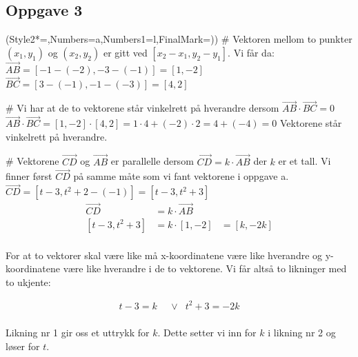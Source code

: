 \subsection*{Oppgave 3}

\begin{easylist}[enumerate]
	\ListProperties(Style2*=,Numbers=a,Numbers1=l,FinalMark={)})
	# Vektoren mellom to punkter $(x_1,y_1)$ og $(x_2,y_2)$ er gitt ved $[x_2 - x_1, y_2 -y_1]$. Vi får da: \newline
	$\vec{AB} = [-1-(-2), -3-(-1)] = [1,-2]$\newline
	$\vec{BC} = [3-(-1),-1-(-3)] = [4,2]$
	
	# Vi har at de to vektorene står vinkelrett på hverandre dersom $\vec{AB} \cdot \vec{BC} = 0$\newline
	$\vec{AB} \cdot \vec{BC} = [1,-2] \cdot [4,2] = 1 \cdot 4 + (-2) \cdot 2 = 4 + (-4) = 0$
	\newline \newline
	Vektorene står vinkelrett på hverandre.
	
	# Vektorene $\vec{CD}$ og $\vec{AB}$ er parallelle dersom $\vec{CD} = k \cdot \vec{AB}$ der $k$ er et tall. Vi finner først $\vec{CD}$ på samme måte som vi fant vektorene i oppgave a. \newline
	$\vec{CD} = [t-3,t^2 + 2- (-1)] = [t-3,t^2 + 3]$\newline \newline
	\begin{equation*}
		\begin{aligned}
		\vec{CD} & = k \cdot \vec{AB}\\
		[t-3,t^2 + 3] & = k \cdot [1,-2] &  = [k,-2k]\\
		\end{aligned}
	\end{equation*}
	
	For at to vektorer skal være like må x-koordinatene være like hverandre og y-koordinatene være like hverandre i de to vektorene. Vi får altså to likninger med to ukjente: 
	
	\begin{equation*}
		\begin{aligned}
		t-3 = k &\:\:\: \vee & t^2 + 3 = -2k \\
		\end{aligned}
	\end{equation*}
	
	Likning nr 1 gir oss et uttrykk for $k$. Dette setter vi inn for $k$ i likning nr 2 og løser for $t$.
	

\end{easylist}
